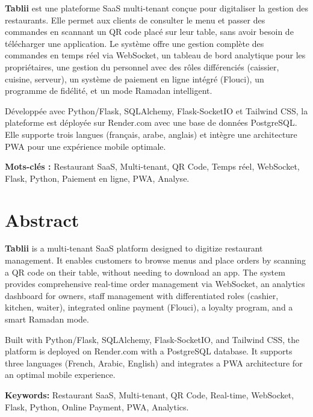 \documentclass[12pt,a4paper]{report}
\begin{document}
\textbf{Tablii} est une plateforme SaaS multi-tenant conçue pour digitaliser la gestion des restaurants. Elle permet aux clients de consulter le menu et passer des commandes en scannant un QR code placé sur leur table, sans avoir besoin de télécharger une application. Le système offre une gestion complète des commandes en temps réel via WebSocket, un tableau de bord analytique pour les propriétaires, une gestion du personnel avec des rôles différenciés (caissier, cuisine, serveur), un système de paiement en ligne intégré (Flouci), un programme de fidélité, et un mode Ramadan intelligent.

Développée avec Python/Flask, SQLAlchemy, Flask-SocketIO et Tailwind CSS, la plateforme est déployée sur Render.com avec une base de données PostgreSQL. Elle supporte trois langues (français, arabe, anglais) et intègre une architecture PWA pour une expérience mobile optimale.

\vspace{0.3cm}
\noindent\textbf{Mots-clés :} Restaurant SaaS, Multi-tenant, QR Code, Temps réel, WebSocket, Flask, Python, Paiement en ligne, PWA, Analyse.

\cleardoublepage

\chapter*{Abstract}

\textbf{Tablii} is a multi-tenant SaaS platform designed to digitize restaurant management. It enables customers to browse menus and place orders by scanning a QR code on their table, without needing to download an app. The system provides comprehensive real-time order management via WebSocket, an analytics dashboard for owners, staff management with differentiated roles (cashier, kitchen, waiter), integrated online payment (Flouci), a loyalty program, and a smart Ramadan mode.

Built with Python/Flask, SQLAlchemy, Flask-SocketIO, and Tailwind CSS, the platform is deployed on Render.com with a PostgreSQL database. It supports three languages (French, Arabic, English) and integrates a PWA architecture for an optimal mobile experience.

\vspace{0.3cm}
\noindent\textbf{Keywords:} Restaurant SaaS, Multi-tenant, QR Code, Real-time, WebSocket, Flask, Python, Online Payment, PWA, Analytics.

\cleardoublepage
\end{document}

